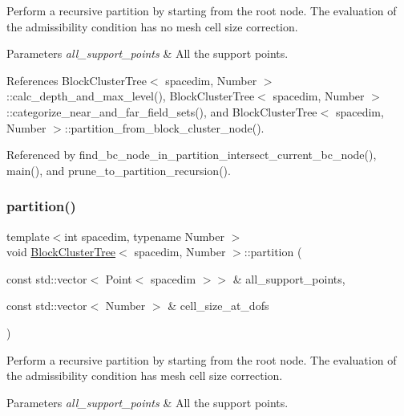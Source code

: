 Perform a recursive partition by starting from the root node. The evaluation of the admissibility condition has no mesh cell size correction.


\begin{DoxyParams}{Parameters}
{\em all\+\_\+support\+\_\+points} & All the support points. \\
\hline
\end{DoxyParams}


References Block\+Cluster\+Tree$<$ spacedim, Number $>$\+::calc\+\_\+depth\+\_\+and\+\_\+max\+\_\+level(), Block\+Cluster\+Tree$<$ spacedim, Number $>$\+::categorize\+\_\+near\+\_\+and\+\_\+far\+\_\+field\+\_\+sets(), and Block\+Cluster\+Tree$<$ spacedim, Number $>$\+::partition\+\_\+from\+\_\+block\+\_\+cluster\+\_\+node().



Referenced by find\+\_\+bc\+\_\+node\+\_\+in\+\_\+partition\+\_\+intersect\+\_\+current\+\_\+bc\+\_\+node(), main(), and prune\+\_\+to\+\_\+partition\+\_\+recursion().

\mbox{\label{classBlockClusterTree_a075983197c805c6451aa00502dc30e76}} 
\subsubsection{\texorpdfstring{partition()}{partition()}\hspace{0.1cm}{\footnotesize\ttfamily [2/2]}}
{\footnotesize\ttfamily template$<$int spacedim, typename Number $>$ \\
void \hyperlink{classBlockClusterTree}{Block\+Cluster\+Tree}$<$ spacedim, Number $>$\+::partition (\begin{DoxyParamCaption}\item[{const std\+::vector$<$ Point$<$ spacedim $>$$>$ \&}]{all\+\_\+support\+\_\+points,  }\item[{const std\+::vector$<$ Number $>$ \&}]{cell\+\_\+size\+\_\+at\+\_\+dofs }\end{DoxyParamCaption})}

Perform a recursive partition by starting from the root node. The evaluation of the admissibility condition has mesh cell size correction.


\begin{DoxyParams}{Parameters}
{\em all\+\_\+support\+\_\+points} & All the support points. \\
\hline
\end{DoxyParams}



